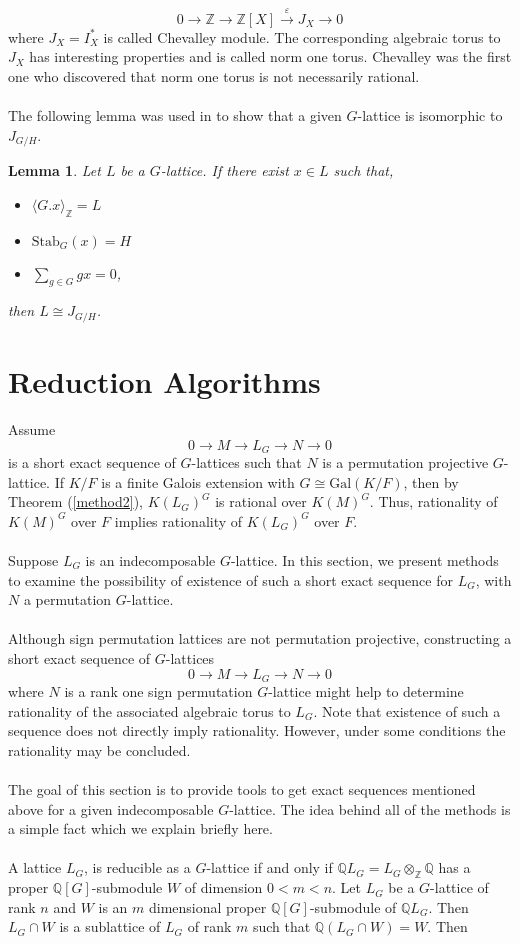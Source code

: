 \documentclass[a4paper, 14pt]{extarticle}
\theoremstyle{plain}
\newtheorem{lemma}[theorem]{Lemma}
\theoremstyle{definition}
\newcommand{\Z}{\ensuremath{\mathbb{Z}}}
\newcommand{\Q}{\ensuremath{\mathbb{Q}}}
\begin{document}
$$0 \longrightarrow \Z \longrightarrow \Z [X] \overset{\varepsilon} \longrightarrow  J_{X} \longrightarrow 0$$
where $J_{X}= I^{\ast}_X$ is called Chevalley module. The corresponding algebraic 
torus to $J_X$ has interesting properties and is called norm one torus. Chevalley 
was the first one who discovered that norm one torus is not necessarily rational. \\
\\
The following lemma was used in \cite{Nicole1} to show that a given $G$-lattice 
is isomorphic to $J_{G/H}$.
\begin{lemma}\cite[Remark 4.1]{Nicole1}
Let $L$ be a $G$-lattice. If there exist $x\in L$ such that,
\begin{itemize}
\item $\langle G.x \rangle_{\Z} = L$
\item $\mathrm{Stab}_G(x) = H$
\item $\sum_{g \in G}gx = 0$,
\end{itemize}
then $L \cong J_{G/H}$.
\end{lemma}

\section{Reduction Algorithms}
Assume $$0 \rightarrow M  \rightarrow L_G \rightarrow N \rightarrow 0$$ is a short 
exact sequence of $G$-lattices such that $N$ is a permutation projective $G$-lattice. 
If $K/F$ is a finite Galois extension with $G \cong \mathrm{Gal}(K/F)$, then by 
Theorem (\ref{method2}), $K(L_G)^G$ is rational over $K(M)^G$. Thus, rationality 
of $K(M)^G$ over $F$ implies rationality of $K(L_G)^G$ over $F$.\\
\\
Suppose $L_G$ is an indecomposable $G$-lattice. In this section, we present methods 
to examine the possibility of existence of such a short exact sequence for $L_G$, with
 $N$ a permutation $G$-lattice.\\
\\
Although sign permutation lattices are not permutation projective, constructing a 
short exact sequence of $G$-lattices $$0 \rightarrow M  \rightarrow L_G \rightarrow N \rightarrow 0$$ 
where $N$ is a rank one sign permutation $G$-lattice might help to determine 
rationality of the associated algebraic torus to $L_G$. Note that existence of 
such a sequence does not directly imply rationality. However, under some conditions 
the rationality may be concluded. \\
\\
The goal of this section is to provide tools to get exact sequences mentioned above 
for a given indecomposable $G$-lattice. The idea behind all of the methods is a simple 
fact which we explain briefly here.  \\
\\
A lattice $L_G$, is reducible as a $G$-lattice if and only if $\Q L_G = L_G \otimes_{\Z} \Q$ 
has a proper $\Q[G]$-submodule $W$ of dimension $0 < m < n$. Let $L_G$ be a $G$-lattice of 
rank $n$ and $W$ is an $m$ dimensional proper $\Q[G]$-submodule of $\Q L_G$. Then $L_G \cap W$ 
is a sublattice of $L_G$ of rank $m$ such that $\Q (L_G \cap W) = W$. Then
\end{document}
